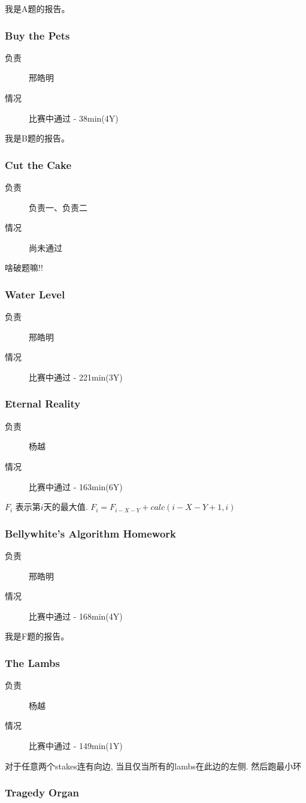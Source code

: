 \documentclass[a4paper, 11pt, nofonts, nocap, fancyhdr]{ctexart}
\newcommand{\problem}[1]{\subsubsection{#1}}
\begin{document}
我是A题的报告。

\problem{Buy the Pets}

\begin{description}
\item[负责] 邢皓明
\item[情况] 比赛中通过 - 38min(4Y)
\end{description}

我是B题的报告。

\problem{Cut the Cake}

\begin{description}
\item[负责] 负责一、负责二
\item[情况] 尚未通过
\end{description}

啥破题嘛!!

\problem{Water Level}

\begin{description}
\item[负责] 邢皓明
\item[情况] 比赛中通过 - 221min(3Y)
\end{description}

\problem{Eternal Reality}

\begin{description}
\item[负责] 杨越
\item[情况] 比赛中通过 - 163min(6Y)
\end{description}

$F_i$ 表示第$i$天的最大值. $F_i = F_{i-X-Y} + calc(i-X-Y+1, i)$ 

\problem{Bellywhite's Algorithm Homework}

\begin{description}
\item[负责] 邢皓明
\item[情况] 比赛中通过 - 168min(4Y)
\end{description}

我是F题的报告。

\problem{The Lambs}

\begin{description}
\item[负责] 杨越
\item[情况] 比赛中通过 - 149min(1Y)
\end{description}

对于任意两个stakes连有向边, 当且仅当所有的lambs在此边的左侧. 然后跑最小环

\problem{Tragedy Organ}
\end{document}
